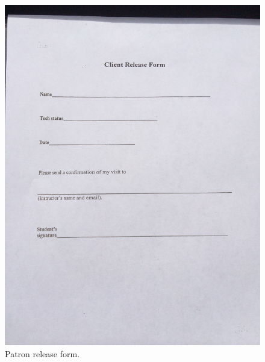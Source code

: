 \documentclass[12pt]{article} %
\begin{document}
  \begin{figure}[H]
  \centering
  \includegraphics[width=0.5\linewidth]{"client release form"}
  \caption{Patron release form.}
  \label{fig:PatronReleaseForm}
  \end{figure}
\end{document}
